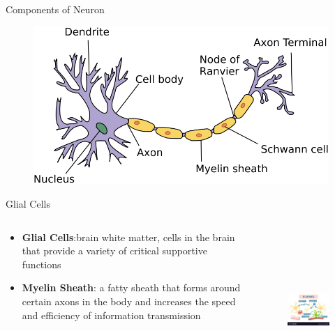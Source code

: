\documentclass{beamer} %
\begin{document}
\begin{frame}{Components of Neuron}
\begin{figure}
    \includegraphics[width=\textwidth,height = 6cm]{800px-Neuron.svg.png}
\end{figure}
\end{frame}
\begin{frame}{Glial Cells}
\begin{columns}
\begin{column}{0.5\textwidth}
\begin{itemize}
    \item \textbf{Glial Cells}:brain white matter, cells in the brain that provide a variety of critical supportive functions
    \item \textbf{Myelin Sheath}: a fatty sheath that forms around certain axons in the body and increases the speed and efficiency of information transmission
\end{itemize}
\end{column}
\begin{column}{0.45\textwidth}
\begin{figure}
    \includegraphics[width=\textwidth,height = 6cm]{nervous-system-glial-cells-schematic-diagram-vector-19591887.jpg}
\end{figure}
\end{column}
\end{columns}
\end{frame}
\end{document}
